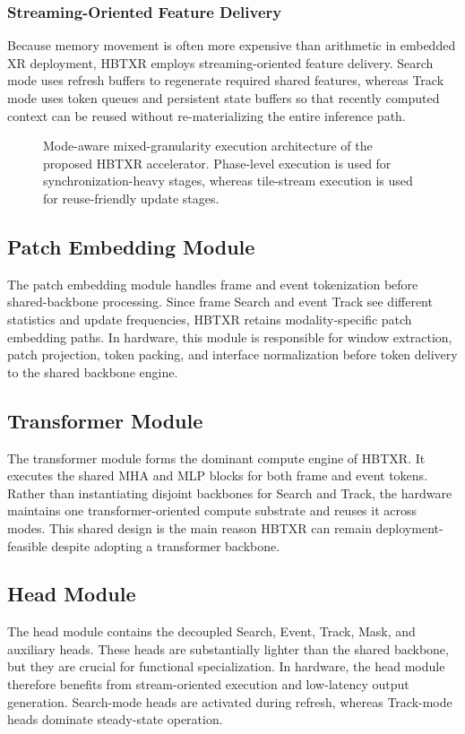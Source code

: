 \documentclass[journal]{IEEEtran}
\newcommand{\placeholderfigure}[2]{%
  \fbox{\parbox[c][#2][c]{#1}{\centering\vspace{2mm}\textbf{Figure placeholder}\\Final artwork pending\vspace{2mm}}}}
\begin{document}
\subsubsection{Streaming-Oriented Feature Delivery}
Because memory movement is often more expensive than arithmetic in embedded XR deployment, HBTXR employs streaming-oriented feature delivery. Search mode uses refresh buffers to regenerate required shared features, whereas Track mode uses token queues and persistent state buffers so that recently computed context can be reused without re-materializing the entire inference path.

\begin{figure}[t]
\centering
\placeholderfigure{0.93\textwidth}{1.95in}
\caption{Mode-aware mixed-granularity execution architecture of the proposed HBTXR accelerator. Phase-level execution is used for synchronization-heavy stages, whereas tile-stream execution is used for reuse-friendly update stages.}
\label{fig:hw}
\end{figure}

\subsection{Patch Embedding Module}
The patch embedding module handles frame and event tokenization before shared-backbone processing. Since frame Search and event Track see different statistics and update frequencies, HBTXR retains modality-specific patch embedding paths. In hardware, this module is responsible for window extraction, patch projection, token packing, and interface normalization before token delivery to the shared backbone engine.

\subsection{Transformer Module}
The transformer module forms the dominant compute engine of HBTXR. It executes the shared MHA and MLP blocks for both frame and event tokens. Rather than instantiating disjoint backbones for Search and Track, the hardware maintains one transformer-oriented compute substrate and reuses it across modes. This shared design is the main reason HBTXR can remain deployment-feasible despite adopting a transformer backbone.

\subsection{Head Module}
The head module contains the decoupled Search, Event, Track, Mask, and auxiliary heads. These heads are substantially lighter than the shared backbone, but they are crucial for functional specialization. In hardware, the head module therefore benefits from stream-oriented execution and low-latency output generation. Search-mode heads are activated during refresh, whereas Track-mode heads dominate steady-state operation.
\end{document}
